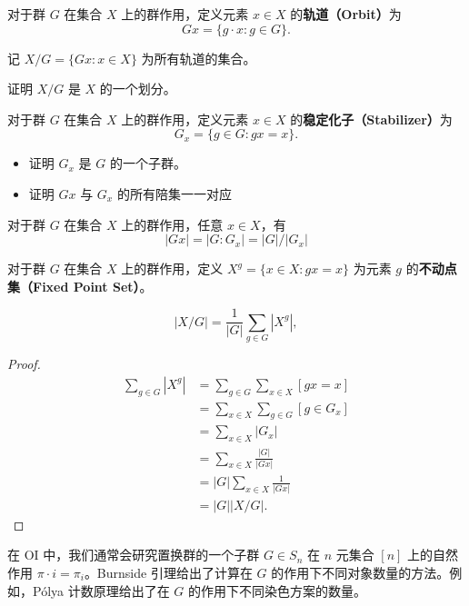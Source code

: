 \begin{definition}[轨道]
    对于群 $G$ 在集合 $X$ 上的群作用，定义元素 $x \in X$ 的\textbf{轨道（Orbit）}为
    $$
    Gx=\{g\cdot x:g\in G\}.
    $$

    记 $X/G=\{Gx:x\in X\}$ 为所有轨道的集合。
\end{definition}
\begin{exercise}
    证明 $X/G$ 是 $X$ 的一个划分。
\end{exercise}
\begin{definition}[稳定化子]
    对于群 $G$ 在集合 $X$ 上的群作用，定义元素 $x \in X$ 的\textbf{稳定化子（Stabilizer）}为
    $$
    G_x=\{g\in G:gx=x\}.
    $$
\end{definition}
\begin{exercise}
    \begin{itemize}
        \item 证明 $G_x$ 是 $G$ 的一个子群。
        \item 证明 $Gx$ 与 $G_x$ 的所有陪集一一对应
    \end{itemize}
\end{exercise}
\begin{theorem}[轨道-稳定化子定理]
    对于群 $G$ 在集合 $X$ 上的群作用，任意 $x \in X$，有
    $$
    |Gx|=|G:G_x|=|G|/|G_x|
    $$
\end{theorem}

\begin{definition}
    对于群 $G$ 在集合 $X$ 上的群作用，定义 $X^g=\{x\in X:gx=x\}$ 为元素 $g$ 的\textbf{不动点集（Fixed Point Set）}。
\end{definition}
\begin{lemma}[Burnside 引理]
    $$
    |X/G|=\frac{1}{|G|}\sum_{g\in G}|X^g|,
    $$
\end{lemma}
\begin{proof}
$$
\begin{aligned}
    \sum_{g\in G}|X^g|&=\sum_{g\in G}\sum_{x\in X}[gx=x]\\
    &=\sum_{x\in X}\sum_{g\in G}[g\in G_x]\\
    &=\sum_{x\in X}|G_x|\\
    &=\sum_{x\in X}\frac{|G|}{|Gx|}\\
    &=|G|\sum_{x\in X}\frac{1}{|Gx|}\\
    &=|G||X/G|.
\end{aligned}
$$
\end{proof}

在 OI 中，我们通常会研究置换群的一个子群 $G\in S_n$ 在 $n$ 元集合 $[n]$ 上的自然作用 $\pi\cdot i=\pi_i$。Burnside 引理给出了计算在 $G$ 的作用下不同对象数量的方法。例如，P\'olya 计数原理给出了在 $G$ 的作用下不同染色方案的数量。

